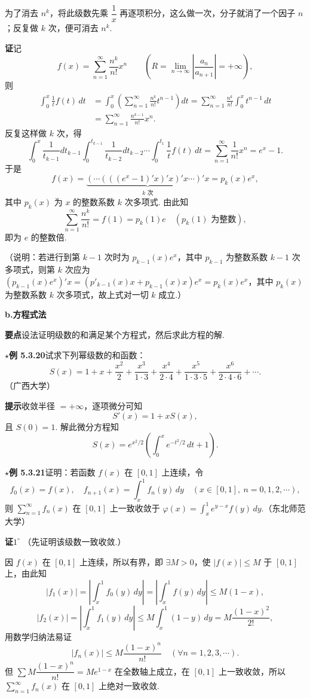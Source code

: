 \documentclass[UTF8,12pt,a4paper,fontset=fandol]{ctexart}
\begin{document}
为了消去 $n^k$，将此级数先乘 $\dfrac1x$ 再逐项积分，这么做一次，分子就消了一个因子 $n$；反复做 $k$ 次，便可消去 $n^k$.

\noindent\textbf{证}\quad 记
\[
  f(x)=\sum_{n=1}^{\infty}\frac{n^k}{n!}x^n
  \qquad\left(R=\lim_{n\to\infty}\left|\frac{a_n}{a_{n+1}}\right|=+\infty\right),
\]
则
\[
\begin{aligned}
\int_0^x\frac1t f(t)\,dt
&=\int_0^x\left(\sum_{n=1}^{\infty}\frac{n^k}{n!}t^{n-1}\right)dt
=\sum_{n=1}^{\infty}\frac{n^k}{n!}\int_0^x t^{n-1}\,dt\\
&=\sum_{n=1}^{\infty}\frac{n^{k-1}}{n!}x^n.
\end{aligned}
\]
反复这样做 $k$ 次，得
\[
  \int_0^x\frac1{t_{k-1}}dt_{k-1}\int_0^{t_{k-1}}\frac1{t_{k-2}}dt_{k-2}
  \cdots\int_0^{t_1}\frac1t f(t)\,dt
  =\sum_{n=1}^{\infty}\frac1{n!}x^n=e^x-1.
\]
于是
\[
  f(x)=\underbrace{(\cdots(((e^x-1)'x)'x)'x\cdots)'x}_{k\text{ 次}}=p_k(x)e^x,
\]
其中 $p_k(x)$ 为 $x$ 的整数系数 $k$ 次多项式. 由此知
\[
  \sum_{n=1}^{\infty}\frac{n^k}{n!}=f(1)=p_k(1)e\quad(p_k(1)\text{ 为整数}),
\]
即为 $e$ 的整数倍.

（说明：若进行到第 $k-1$ 次时为 $p_{k-1}(x)e^x$，其中 $p_{k-1}$ 为整数系数 $k-1$ 次多项式，则第 $k$ 次应为
$(p_{k-1}(x)e^x)'x=(p'_{k-1}(x)x+p_{k-1}(x)x)e^x=p_k(x)e^x$，其中 $p_k(x)$ 为整数系数 $k$ 次多项式，故上式对一切 $k$ 成立.）

\noindent\textbf{b.\quad 方程式法}

\noindent\textbf{要点}\quad 设法证明级数的和满足某个方程式，然后求此方程的解.

\noindent\(\star\)\textbf{例 5.3.20}\quad 试求下列幂级数的和函数：
\[
  S(x)=1+x+\frac{x^2}{2}+\frac{x^3}{1\cdot3}+\frac{x^4}{2\cdot4}
  +\frac{x^5}{1\cdot3\cdot5}+\frac{x^6}{2\cdot4\cdot6}+\cdots.
\]
（广西大学）

\noindent\textbf{提示}\quad 收敛半径 $=+\infty$，逐项微分可知
\[
  S'(x)=1+xS(x),
\]
且 $S(0)=1$. 解此微分方程知
\[
  S(x)=e^{x^2/2}\left(\int_0^x e^{-t^2/2}\,dt+1\right).
\]

\noindent\(\star\)\textbf{例 5.3.21}\quad 证明：若函数 $f(x)$ 在 $[0,1]$ 上连续，令
\[
  f_0(x)=f(x),\quad f_{n+1}(x)=\int_x^1 f_n(y)\,dy
  \quad(x\in[0,1],\ n=0,1,2,\cdots),
\]
则 $\displaystyle\sum_{n=1}^{\infty}f_n(x)$ 在 $[0,1]$ 上一致收敛于
$\varphi(x)=\displaystyle\int_x^1 e^{y-x}f(y)\,dy$.（东北师范大学）

\noindent\textbf{证}\quad $1^\circ$ （先证明该级数一致收敛.）

因 $f(x)$ 在 $[0,1]$ 上连续，所以有界，即 $\exists M>0$，使 $|f(x)|\le M$ 于 $[0,1]$ 上，由此知
\[
  |f_1(x)|=\left|\int_x^1 f_0(y)\,dy\right|
  =\left|\int_x^1 f(y)\,dy\right|\le M(1-x),
\]
\[
  |f_2(x)|=\left|\int_x^1 f_1(y)\,dy\right|
  \le M\int_x^1(1-y)\,dy=M\frac{(1-x)^2}{2!},
\]
用数学归纳法易证
\[
  |f_n(x)|\le M\frac{(1-x)^n}{n!}\quad(\forall n=1,2,3,\cdots).
\]
但 $\displaystyle\sum M\dfrac{(1-x)^n}{n!}=Me^{1-x}$ 在全数轴上成立，在 $[0,1]$ 上一致收敛，所以
$\displaystyle\sum_{n=1}^{\infty}f_n(x)$ 在 $[0,1]$ 上绝对一致收敛.
\end{document}
